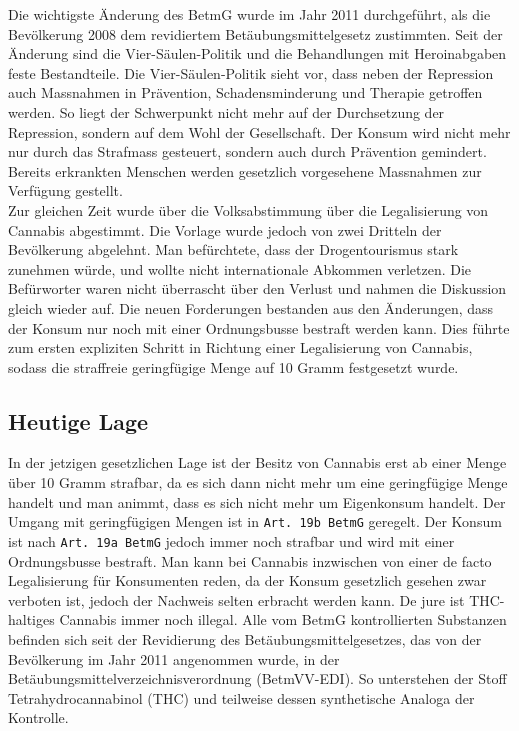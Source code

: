 \documentclass[../main.tex]{subfiles}
\begin{document}
	 \noindent
	 Die wichtigste Änderung des BetmG wurde im Jahr 2011 durchgeführt, als die Bevölkerung 2008 dem revidiertem Betäubungsmittelgesetz zustimmten. 
	 Seit der Änderung sind die Vier-Säulen-Politik und die Behandlungen mit Heroinabgaben feste Bestandteile. Die Vier-Säulen-Politik sieht vor, dass neben der Repression auch Massnahmen in Prävention, Schadensminderung und Therapie getroffen werden. 
	 So liegt der Schwerpunkt nicht mehr auf der Durchsetzung der Repression, sondern auf dem Wohl der Gesellschaft.
	 Der Konsum wird nicht mehr nur durch das Strafmass gesteuert, sondern auch durch Prävention gemindert. 
	 Bereits erkrankten Menschen werden gesetzlich vorgesehene Massnahmen zur Verfügung gestellt.\\
	 
	 \noindent
	 Zur gleichen Zeit wurde über die Volksabstimmung über die Legalisierung von Cannabis abgestimmt.
	 Die Vorlage wurde jedoch von zwei Dritteln der Bevölkerung abgelehnt.
	 Man befürchtete, dass der Drogentourismus stark zunehmen würde, und wollte nicht internationale Abkommen verletzen.
	 Die Befürworter waren nicht überrascht über den Verlust und nahmen die Diskussion gleich wieder auf. 
	 Die neuen Forderungen bestanden aus den Änderungen, dass der Konsum nur noch mit einer Ordnungsbusse bestraft werden kann. 
	 Dies führte zum ersten expliziten Schritt in Richtung einer Legalisierung von Cannabis, sodass die straffreie geringfügige Menge auf 10 Gramm festgesetzt wurde.
	 
	 
	 \subsection{Heutige Lage}
	 In der jetzigen gesetzlichen Lage ist der Besitz von Cannabis erst ab einer Menge über 10 Gramm strafbar, da es sich dann nicht mehr um eine geringfügige Menge handelt und man animmt, dass es sich nicht mehr um Eigenkonsum handelt.
	 Der Umgang mit geringfügigen Mengen ist in \texttt{Art. 19b BetmG} geregelt.
	 Der Konsum ist nach \texttt{Art. 19a BetmG} jedoch immer noch strafbar und wird mit einer Ordnungsbusse bestraft. 
	 Man kann bei Cannabis inzwischen von einer de facto Legalisierung für Konsumenten reden, da der Konsum gesetzlich gesehen zwar verboten ist, jedoch der Nachweis selten erbracht werden kann. 
	 De jure ist THC-haltiges Cannabis immer noch illegal. 
	 Alle vom BetmG kontrollierten Substanzen befinden sich seit der Revidierung des Betäubungsmittelgesetzes, das von der Bevölkerung im Jahr 2011 angenommen wurde, in der Betäubungsmittelverzeichnisverordnung (BetmVV-EDI). 
	 So unterstehen der Stoff Tetrahydrocannabinol (THC) und teilweise dessen synthetische Analoga der Kontrolle.\\
	 
\end{document}
